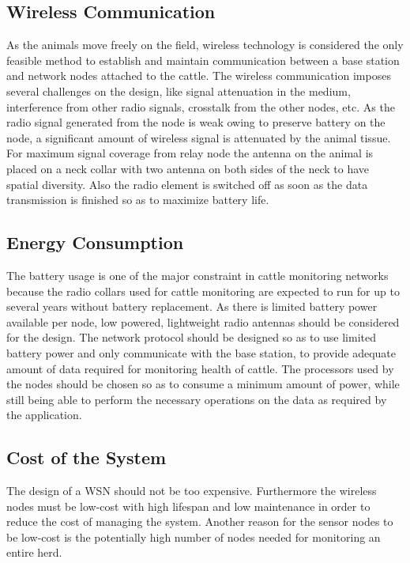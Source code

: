 \documentclass[conference]{IEEEtran}
\begin{document}
\subsection{Wireless Communication}

As the animals move freely on the field, wireless technology is considered the
only feasible method to establish and maintain communication between a base
station and network nodes attached to the cattle. The wireless communication
imposes several challenges on the design, like signal attenuation in the
medium, interference from other radio signals, crosstalk from the other nodes,
etc. As the radio signal generated from the node is weak owing to preserve
battery on the node, a significant amount of wireless signal is attenuated by
the animal tissue.  For maximum signal coverage from relay node the antenna on
the animal is placed on a neck collar with two antenna on both sides of the
neck to have spatial diversity. Also the radio element is switched off as soon
as the data transmission is finished so as to maximize battery life.

\subsection{Energy Consumption}

The battery usage is one of the major constraint in cattle monitoring networks
because the radio collars used for cattle monitoring are expected to run for up
to several years without battery replacement. As there is limited battery power
available per node, low powered, lightweight radio antennas should be
considered for the design. The network protocol should be designed so as to use
limited battery power and only communicate with the base station, to provide
adequate amount of data required for monitoring health of cattle. The
processors used by the nodes should be chosen so as to consume a minimum amount
of power, while still being able to perform the necessary operations on the
data as required by the application.

\subsection{Cost of the System}

The design of a WSN should not be too expensive. Furthermore the wireless nodes
must be low-cost with high lifespan and low maintenance in order to reduce the
cost of managing the system. Another reason for the sensor nodes to be low-cost
is the potentially high number of nodes needed for monitoring an entire herd.
\end{document}
